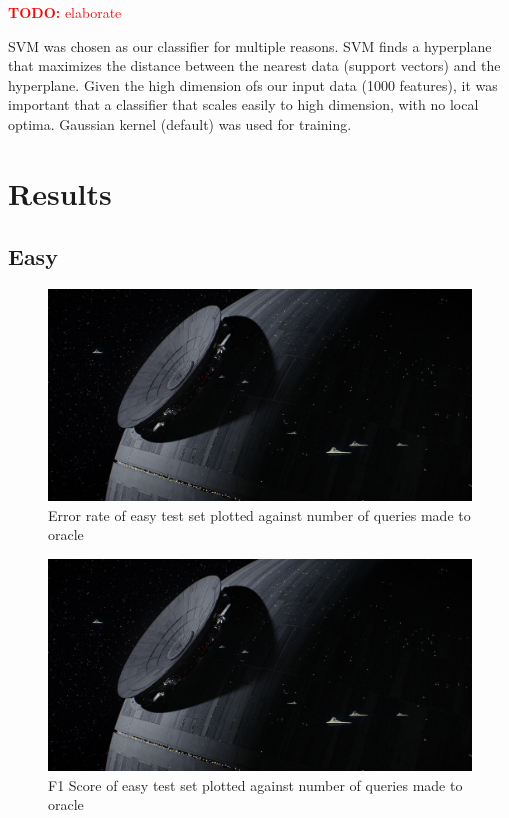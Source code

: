 \documentclass[paper=a4, fontsize=11pt]{scrartcl}
\numberwithin{equation}{section}    %
\numberwithin{figure}{section}      %
\numberwithin{table}{section}       %
\newcommand{\TODO}[1]{\textcolor{red}{\textbf{TODO: } #1}}
\numberwithin{equation}{section}    %
\numberwithin{figure}{section}      %
\numberwithin{table}{section}       %
\begin{document}
\TODO{elaborate}


SVM was chosen as our classifier for multiple reasons. SVM finds a hyperplane that maximizes the distance between the nearest data (support vectors) and the hyperplane. Given the high dimension ofs our input data (1000 features), it was important that a classifier that scales easily to high dimension, with no local optima. 
Gaussian kernel (default) was used for training. 


\section{Results}

\subsection{Easy}


\begin{figure}[!htb]
  \centering
  \includegraphics[scale = 0.35]{figures/fig.jpg}
      \caption{Error rate of easy test set plotted against number of queries made to oracle}
      \label{easyerror}
\end{figure}


\begin{figure}[!htb]
  \centering
  \includegraphics[scale = 0.35]{figures/fig.jpg}
      \caption{F1 Score of easy test set plotted against number of queries made to oracle}
      \label{easyf}
\end{figure}
\end{document}

